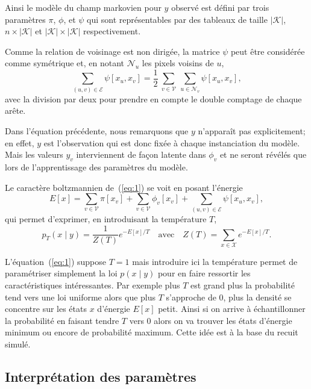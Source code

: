 \documentclass[a4paper,11pt,oneside]{article}
\begin{document}
Ainsi le modèle du champ markovien pour $y$ observé est
défini par trois paramètres $\pi$, $\phi$, et $\psi$ qui
sont représentables par des tableaux de taille $|\mathcal
K|$, $n\times|\mathcal K|$ et $|\mathcal K|\times|\mathcal
K|$ respectivement.

Comme la relation de voisinage est non dirigée, la matrice
$\psi$ peut être considérée comme symétrique et, en notant
$\mathcal N_u$ les pixels voisins de $u$,
\begin{equation}
  \label{eq:2}
  \sum_{(u,v)\in\mathcal E} \psi[x_u, x_v]
  = \frac12\:
      \sum_{v\in\mathcal V}\:
        \sum_{u\in\mathcal N_v} \psi[x_u, x_v],
\end{equation}
avec la division par deux pour prendre en compte le double
comptage de chaque arête.

Dans l'équation précédente, nous remarquons que $y$
n'apparaît pas explicitement; en effet, $y$ est
l'observation qui est donc fixée à chaque instanciation du
modèle. Mais les valeurs $y_v$ interviennent de façon
latente dans $\phi_v$ et ne seront révélés que lors de
l'apprentissage des paramètres du modèle.

Le caractère boltzmannien de~(\ref{eq:1}) se voit en posant
l'énergie
\begin{equation}
  \label{eq:3}
  E[x] =
  \sum_{v\in\mathcal V} \pi[x_v]
  + \sum_{v\in\mathcal V} \phi_v[x_v]
  + \sum_{(u,v)\in\mathcal E} \psi[x_u, x_v],
\end{equation}
qui permet d'exprimer, en introduisant la température $T$,
\begin{equation}
  \label{eq:4}
  p_T(x\mid y) = \frac1{Z(T)} e^{-E[x]/T}
  \quad
  \text{avec}\quad Z(T) = \sum_{x\in\mathcal X} e^{-E[x]/T}.
\end{equation}

L'équation~(\ref{eq:1}) suppose $T=1$ mais introduire ici la
température permet de paramétriser simplement la loi
$p(x\mid y)$ pour en faire ressortir les caractéristiques
intéressantes. Par exemple plus $T$ est grand plus la
probabilité tend vers une loi uniforme alors que plus $T$
s'approche de $0$, plus la densité se concentre sur les
états $x$ d'énergie $E[x]$ petit. Ainsi si on arrive
à échantillonner la probabilité en faisant tendre $T$ vers
$0$ alors on va trouver les états d'énergie minimum ou
encore de probabilité maximum. Cette idée est à la base du
recuit simulé.



\subsection{Interprétation des paramètres}
\label{sec:interpretation}
\end{document}

